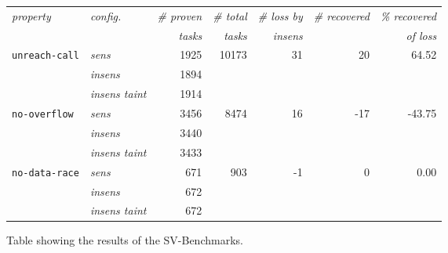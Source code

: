       \begin{figure}
        \centering
        \begin{tabular}{l|l||r|r||r|r|r}
          \textit{property} & \textit{config.} & \textit{\# proven} & \textit{\# total} & \textit{\# loss by} & \textit{\# recovered} & \textit{\% recovered}\\
            &  & \textit{tasks} & \textit{tasks} & \textit{insens} & & \textit{of loss}\\
          \hline
          \texttt{unreach-call} & \textit{sens} & 1925 & 10173 & 31 & 20 & 64.52\\
          & \textit{insens} & 1894 & & & & \\
          & \textit{insens taint} & 1914 & & & & \\
          \hline
          \texttt{no-overflow} & \textit{sens} & 3456 & 8474 & 16 & -17 & -43.75\\
          & \textit{insens} & 3440 & & & & \\
          & \textit{insens taint} & 3433 & & & & \\
          \hline
          \texttt{no-data-race} & \textit{sens} & 671 & 903 & -1 & 0 & 0.00\\
          & \textit{insens} & 672 & & & & \\
          & \textit{insens taint} & 672 & & & & \\
          \hline
        \end{tabular}
        \caption{Table showing the results of the SV-Benchmarks.}
        \label{fig:resultSVbenchTable}
      \end{figure}

